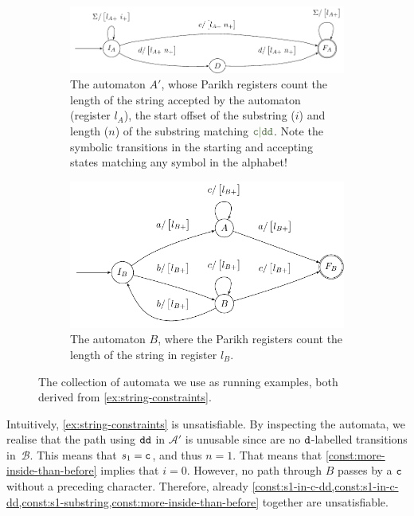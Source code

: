 \begin{figure}[ht]
    \centering 
  \begin{subfigure}[b]{\autscale\textwidth}
    \centering
    \includegraphics[width=\textwidth]{a}
    \caption{The automaton $A'$, whose Parikh registers count the length of the
    string accepted by the automaton (register $l_A$), the start offset of the
    substring ($i$) and length ($n$) of the substring matching
    $\Regex{c\RegexOr{}dd}$. Note the symbolic transitions in the starting and
    accepting states matching any symbol in the alphabet!}\label{fig:aut_a}
  \end{subfigure}%
  \hfill%
  \begin{subfigure}[b]{\autscale\textwidth}
    \centering
    \includegraphics[width=\textwidth]{b}
    \caption{The automaton $B$, where the Parikh registers count the length of
    the string in register $l_B$.}\label{fig:aut_b}
  \end{subfigure}
  \caption{The collection of automata we use as running
  examples, both derived from \cref{ex:string-constraints}.}\label{fig:examples}
\end{figure}

Intuitively, \cref{ex:string-constraints} is unsatisfiable. By inspecting the
automata, we realise that the path using $\texttt{dd}$ in $\mathcal{A}'$ is unusable since
are no $\texttt{d}$-labelled transitions in~$\mathcal{B}$. This means that $s_1 = \texttt{c}$,
and thus $n = 1$. That means that \cref{const:more-inside-than-before} implies
that $i = 0$. However, no path through $B$ passes by a $\texttt{c}$ without a
preceding character. Therefore, already
\cref{const:s1-in-c-dd,const:s1-in-c-dd,const:s1-substring,const:more-inside-than-before}
together are unsatisfiable.

